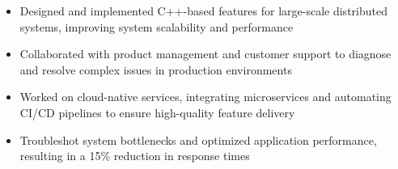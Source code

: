\par\bigskip
{}
\par\smallskip
\begin{minipage}{13.75cm}
  \begin{minipage}{6.5cm}
    \begin{itemize}
      \item Designed and implemented C++-based features for large-scale distributed systems, improving system scalability and performance
      \item Collaborated with product management and customer support to diagnose and resolve complex issues in production environments
    \end{itemize}
  \end{minipage}
  \hfill
  \begin{minipage}{6.5cm}
    \begin{itemize}
      \item Worked on cloud-native services, integrating microservices and automating CI/CD pipelines to ensure high-quality feature delivery
      \item Troubleshot system bottlenecks and optimized application performance, resulting in a 15\% reduction in response times
    \end{itemize}
  \end{minipage}
\end{minipage}
\par\smallskip
\divider

